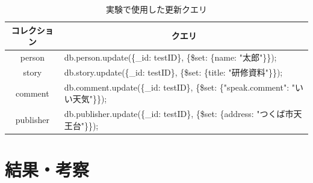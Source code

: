 \documentclass[a4paper,11pt]{ujreport}
\begin{document}
\begin{table}[htb]
  \begin{center}
    \caption{実験で使用した更新クエリ}
		\label{table:ExperimentUpdateQuery}
    \begin{tabular}{|c|l|} \hline
      コレクション & \multicolumn{1}{|c|}{クエリ}\\ \hline
      person & db.person.update(\{\_id: testID\}, \{\$set: \{name: "太郎"\}\});\\ \hline
			story & db.story.update(\{\_id: testID\}, \{\$set: \{title: "研修資料"\}\});\\ \hline
      comment & db.comment.update(\{\_id: testID\}, \{\$set: \{"speak.comment": "いい天気"\}\});\\ \hline
      publisher & db.publisher.update(\{\_id: testID\}, \{\$set: \{address: "つくば市天王台"\}\});\\ \hline
    \end{tabular}
  \end{center}
\end{table}

\chapter{結果・考察}
\label{chap:Result}
\end{document}
